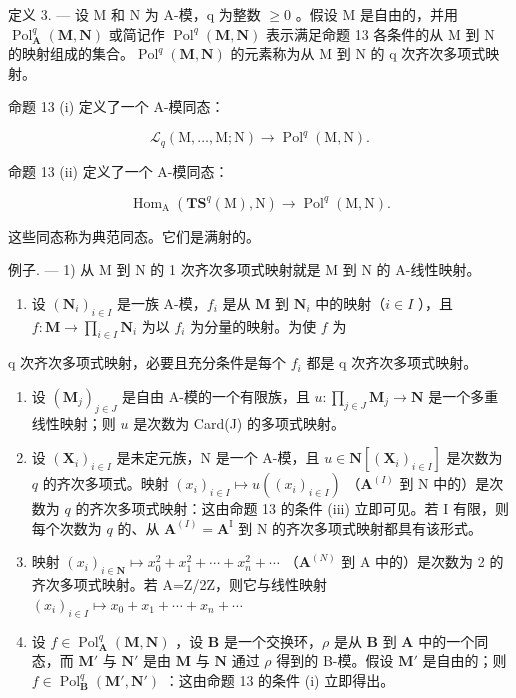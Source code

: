 定义 3. --- 设 M 和 N 为 A-模，q 为整数 \(\geqslant 0\) 。假设 M 是自由的，并用 \(\operatorname{Pol}_{\mathbf{A}}^{q}(\mathbf{M}, \mathbf{N})\) 或简记作 \(\operatorname{Pol}^{q}(\mathbf{M}, \mathbf{N})\) 表示满足命题 13 各条件的从 M 到 N 的映射组成的集合。\(\operatorname{Pol}^{q}(\mathbf{M}, \mathbf{N})\) 的元素称为从 M 到 N 的 q 次齐次多项式映射。

命题 13 (i) 定义了一个 A-模同态：

\[
\mathcal {L} _ {q} (\mathrm{M}, \dots , \mathrm{M}; \mathrm{N}) \rightarrow \operatorname{Pol} ^ {q} (\mathrm{M}, \mathrm{N}).
\]

命题 13 (ii) 定义了一个 A-模同态：

\[
\operatorname{Hom} _ {\mathrm{A}} \left(\mathbf {T S} ^ {q} (\mathrm{M}), \mathrm{N}\right)\rightarrow \operatorname{Pol} ^ {q} (\mathrm{M}, \mathrm{N}).
\]

这些同态称为典范同态。它们是满射的。

例子. --- 1) 从 M 到 N 的 1 次齐次多项式映射就是 M 到 N 的 A-线性映射。

\begin{enumerate}
\def\labelenumi{\arabic{enumi})}
\setcounter{enumi}{1}
\tightlist
\item
  设 \((\mathbf{N}_i)_{i\in I}\) 是一族 A-模，\(f_{i}\) 是从 \(\mathbf{M}\) 到 \(\mathbf{N}_i\) 中的映射（\(i\in I\) ），且 \(f:\mathbf{M}\to \prod_{i\in I}\mathbf{N}_i\) 为以 \(f_{i}\) 为分量的映射。为使 \(f\) 为
\end{enumerate}

q 次齐次多项式映射，必要且充分条件是每个 \(f_{i}\) 都是 q 次齐次多项式映射。

\begin{enumerate}
\def\labelenumi{\arabic{enumi})}
\setcounter{enumi}{2}
\item
  设 \((\mathbf{M}_j)_{j\in J}\) 是自由 A-模的一个有限族，且 \(u:\prod_{j\in J}\mathbf{M}_j\to \mathbf{N}\) 是一个多重线性映射；则 \(u\) 是次数为 Card(J) 的多项式映射。
\item
  设 \((\mathbf{X}_i)_{i\in I}\) 是未定元族，N 是一个 A-模，且 \(u\in \mathbf{N}[(\mathbf{X}_i)_{i\in I}]\) 是次数为 \(q\) 的齐次多项式。映射 \((x_{i})_{i\in I}\mapsto u((x_{i})_{i\in I})\) （\(\mathbf{A}^{(I)}\) 到 N 中的）是次数为 \(q\) 的齐次多项式映射：这由命题 13 的条件 (iii) 立即可见。若 I 有限，则每个次数为 \(q\) 的、从 \(\mathbf{A}^{(I)} = \mathbf{A}^{\mathrm{I}}\) 到 N 的齐次多项式映射都具有该形式。
\item
  映射 \((x_{i})_{i\in\mathbf{N}}\mapsto x_{0}^{2}+x_{1}^{2}+\cdots+x_{n}^{2}+\cdots\) （\(\mathbf{A}^{(N)}\) 到 A 中的）是次数为 2 的齐次多项式映射。若 A=Z/2Z，则它与线性映射 \((x_{i})_{i\in I}\mapsto x_{0}+x_{1}+\cdots+x_{n}+\cdots\)
\item
  设 \(f \in \operatorname{Pol}_{\mathbf{A}}^{q}(\mathbf{M}, \mathbf{N})\) ，设 \(\mathbf{B}\) 是一个交换环，\(\rho\) 是从 \(\mathbf{B}\) 到 \(\mathbf{A}\) 中的一个同态，而 \(\mathbf{M}'\) 与 \(\mathbf{N}'\) 是由 \(\mathbf{M}\) 与 \(\mathbf{N}\) 通过 \(\rho\) 得到的 B-模。假设 \(\mathbf{M}'\) 是自由的；则 \(f \in \operatorname{Pol}_{\mathbf{B}}^{q}(\mathbf{M}', \mathbf{N}')\) ：这由命题 13 的条件 (i) 立即得出。
\end{enumerate}

